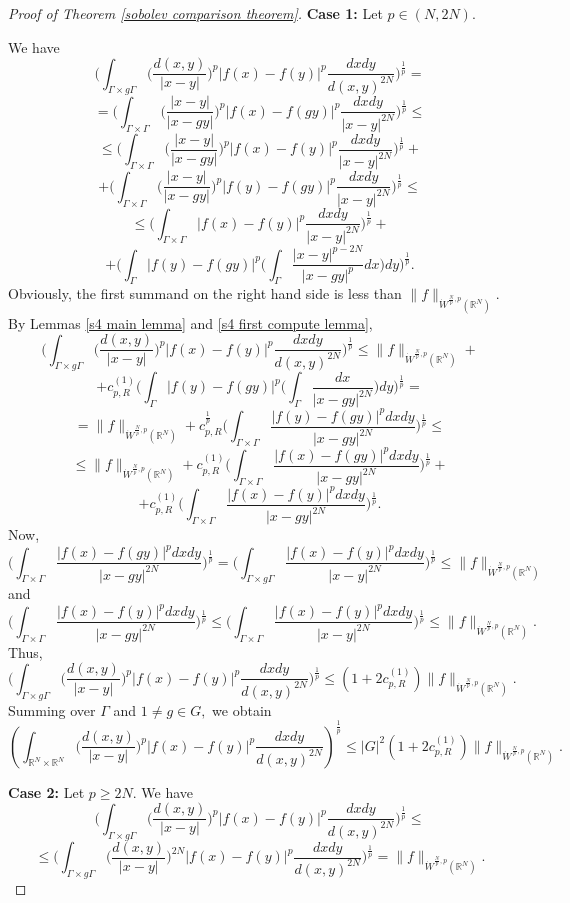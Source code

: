 \documentclass{amsart}
\numberwithin{equation}{section}
\begin{document}
\begin{proof}[Proof of Theorem \ref{sobolev comparison theorem}] {\bf Case 1:} Let $p\in(N,2N).$

We have
$$\Big(\int_{\Gamma\times g\Gamma}\Big(\frac{d(x,y)}{|x-y|}\Big)^p|f(x)-f(y)|^p \frac{dxdy}{d(x,y)^{2N}}\Big)^{\frac1p}=$$
$$=\Big(\int_{\Gamma\times \Gamma}\Big(\frac{|x-y|}{|x-gy|}\Big)^p|f(x)-f(gy)|^p \frac{dxdy}{|x-y|^{2N}}\Big)^{\frac1p}\leq$$
$$\leq\Big(\int_{\Gamma\times \Gamma}\Big(\frac{|x-y|}{|x-gy|}\Big)^p|f(x)-f(y)|^p \frac{dxdy}{|x-y|^{2N}}\Big)^{\frac1p}+$$
$$+\Big(\int_{\Gamma\times \Gamma}\Big(\frac{|x-y|}{|x-gy|}\Big)^p|f(y)-f(gy)|^p \frac{dxdy}{|x-y|^{2N}}\Big)^{\frac1p}\leq$$
$$\leq\Big(\int_{\Gamma\times \Gamma}|f(x)-f(y)|^p \frac{dxdy}{|x-y|^{2N}}\Big)^{\frac1p}+$$
$$+\Big(\int_{\Gamma}|f(y)-f(gy)|^p\Big(\int_{\Gamma}\frac{|x-y|^{p-2N}}{|x-gy|^p}dx\Big)dy\Big)^{\frac1p}.$$
Obviously, the first summand on the right hand side is less than $\|f\|_{\dot{W}^{\frac{N}{p},p}(\mathbb{R}^N)}.$ By Lemmas \ref{s4 main lemma} and \ref{s4 first compute lemma},
$$\Big(\int_{\Gamma\times g\Gamma}\Big(\frac{d(x,y)}{|x-y|}\Big)^p|f(x)-f(y)|^p \frac{dxdy}{d(x,y)^{2N}}\Big)^{\frac1p}\leq \|f\|_{\dot{W}^{\frac{N}{p},p}(\mathbb{R}^N)}+$$
$$+c_{p,R}^{(1)}\Big(\int_{\Gamma}|f(y)-f(gy)|^p\Big(\int_{\Gamma}\frac{dx}{|x-gy|^{2N}}\Big)dy\Big)^{\frac1p}=$$
$$=\|f\|_{\dot{W}^{\frac{N}{p},p}(\mathbb{R}^N)}+c_{p,R}^{\frac1p}\Big(\int_{\Gamma\times \Gamma}\frac{|f(y)-f(gy)|^pdxdy}{|x-gy|^{2N}}\Big)^{\frac1p}\leq$$
$$\leq\|f\|_{\dot{W}^{\frac{N}{p},p}(\mathbb{R}^N)}+c_{p,R}^{(1)}\Big(\int_{\Gamma\times \Gamma}\frac{|f(x)-f(gy)|^pdxdy}{|x-gy|^{2N}}\Big)^{\frac1p}+$$
$$+c_{p,R}^{(1)}\Big(\int_{\Gamma\times \Gamma}\frac{|f(x)-f(y)|^pdxdy}{|x-gy|^{2N}}\Big)^{\frac1p}.$$
Now,
$$\Big(\int_{\Gamma\times \Gamma}\frac{|f(x)-f(gy)|^pdxdy}{|x-gy|^{2N}}\Big)^{\frac1p}=\Big(\int_{\Gamma\times g\Gamma}\frac{|f(x)-f(y)|^pdxdy}{|x-y|^{2N}}\Big)^{\frac1p}\leq \|f\|_{\dot{W}^{\frac{N}{p},p}(\mathbb{R}^N)}$$
and
$$\Big(\int_{\Gamma\times \Gamma}\frac{|f(x)-f(y)|^pdxdy}{|x-gy|^{2N}}\Big)^{\frac1p}\leq \Big(\int_{\Gamma\times \Gamma}\frac{|f(x)-f(y)|^pdxdy}{|x-y|^{2N}}\Big)^{\frac1p}\leq \|f\|_{\dot{W}^{\frac{N}{p},p}(\mathbb{R}^N)}.$$
Thus,
$$\Big(\int_{\Gamma\times g\Gamma}\Big(\frac{d(x,y)}{|x-y|}\Big)^p|f(x)-f(y)|^p \frac{dxdy}{d(x,y)^{2N}}\Big)^{\frac1p}\leq (1+2c_{p,R}^{(1)}) \|f\|_{\dot{W}^{\frac{N}{p},p}(\mathbb{R}^N)}.$$
Summing over $\Gamma$ and $1\neq g\in G,$ we obtain
$$\left(\int_{\mathbb{R}^N\times\mathbb{R}^N}\Big(\frac{d(x,y)}{|x-y|}\Big)^p|f(x)-f(y)|^p \frac{dxdy}{d(x,y)^{2N}}\right)^{\frac1p}\leq |G|^2(1+2c_{p,R}^{(1)})\|f\|_{\dot{W}^{\frac{N}{p},p}(\mathbb{R}^N)}.$$

{\bf Case 2:} Let $p\geq 2N.$ We have
$$\Big(\int_{\Gamma\times g\Gamma}\Big(\frac{d(x,y)}{|x-y|}\Big)^p|f(x)-f(y)|^p \frac{dxdy}{d(x,y)^{2N}}\Big)^{\frac1p}\leq$$
$$\leq\Big(\int_{\Gamma\times g\Gamma}\Big(\frac{d(x,y)}{|x-y|}\Big)^{2N}|f(x)-f(y)|^p \frac{dxdy}{d(x,y)^{2N}}\Big)^{\frac1p}=\|f\|_{\dot{W}^{\frac{N}{p},p}(\mathbb{R}^N)}.$$
\end{proof}
\end{document}

